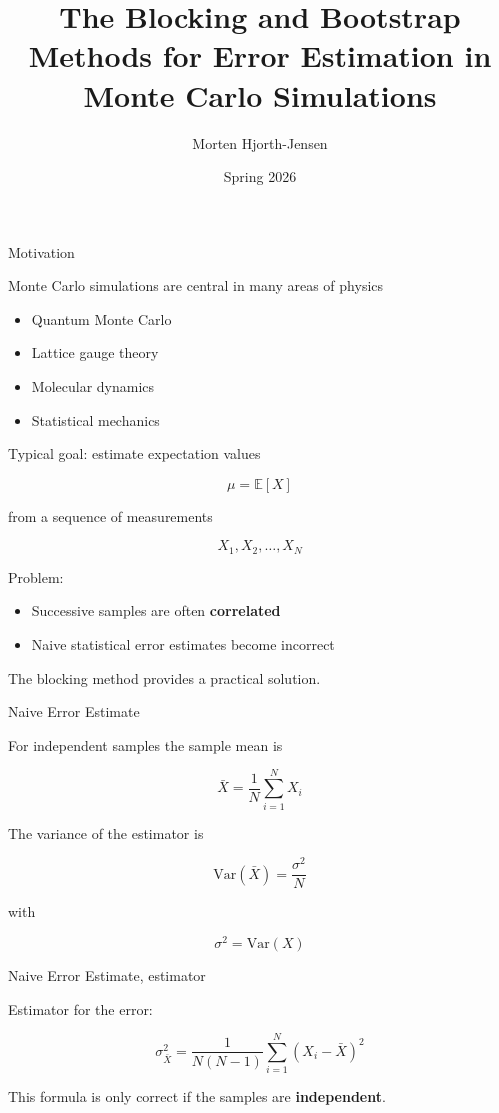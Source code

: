 \documentclass{beamer}
\title{The Blocking and Bootstrap Methods for Error Estimation in Monte Carlo Simulations}
\author{Morten Hjorth-Jensen}
\date{Spring 2026}
\begin{document}
\frame{\titlepage}


\begin{frame}{Motivation}

Monte Carlo simulations are central in many areas of physics

\begin{itemize}
\item Quantum Monte Carlo
\item Lattice gauge theory
\item Molecular dynamics
\item Statistical mechanics
\end{itemize}

Typical goal: estimate expectation values

\[
\mu = \mathbb{E}[X]
\]

from a sequence of measurements

\[
X_1, X_2, \dots, X_N
\]

Problem:

\begin{itemize}
\item Successive samples are often \textbf{correlated}
\item Naive statistical error estimates become incorrect
\end{itemize}

The blocking method provides a practical solution.
\end{frame}


\begin{frame}{Naive Error Estimate}

For independent samples the sample mean is

\[
\bar X = \frac{1}{N}\sum_{i=1}^{N} X_i
\]

The variance of the estimator is

\[
\mathrm{Var}(\bar X)
=
\frac{\sigma^2}{N}
\]

with

\[
\sigma^2 = \mathrm{Var}(X)
\]


\end{frame}




\begin{frame}{Naive Error Estimate, estimator}

Estimator for the error:

\[
\sigma_{\bar X}^2
=
\frac{1}{N(N-1)}
\sum_{i=1}^N (X_i-\bar X)^2
\]

This formula is only correct if the samples are \textbf{independent}.
\end{frame}
\end{document}
